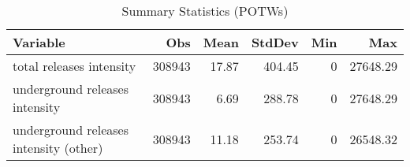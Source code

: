\begin{table}[H]
    \centering
    \caption{Summary Statistics (POTWs)}
    \label{tab:sumstat-potws}
    \begin{tabular}{lrrrrr}
        \toprule\toprule
        Variable                               & Obs    & Mean  & StdDev & Min & Max      \\ \midrule
        total releases intensity               & 308943 & 17.87 & 404.45 & 0   & 27648.29 \\
        underground releases intensity         & 308943 & 6.69  & 288.78 & 0   & 27648.29 \\
        underground releases intensity (other) & 308943 & 11.18 & 253.74 & 0   & 26548.32 \\ \bottomrule \bottomrule
    \end{tabular}
\end{table}
